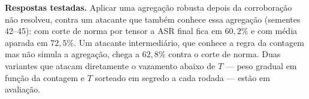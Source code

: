 \textbf{Respostas testadas.} Aplicar uma agregação robusta depois da corroboração não resolveu, contra um
atacante que também conhece essa agregação (sementes 42--45): com corte de norma por tensor a ASR final
fica em $60{,}2\%$ e com média aparada em $72{,}5\%$. Um atacante intermediário, que conhece a regra da
contagem mas não simula a agregação, chega a $62{,}8\%$ contra o corte de norma. Duas variantes que atacam
diretamente o vazamento abaixo de $T$ --- peso gradual em função da contagem e $T$ sorteado em segredo a
cada rodada --- estão em avaliação. 
